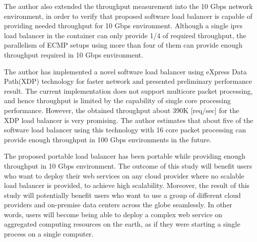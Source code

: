 The author also extended the throughput measurement into the 10 Gbps network environment, in order to verify that proposed software load balancer is capable of providing needed throughput for 10 Gbps environment.
Although a single ipvs load balancer in the container can only provide 1/4 of required throughput, the parallelism of ECMP setups using more than four of them can provide enough throughput required in 10 Gbps environment.

The author has implemented a novel software load balancer using eXpress Data Path(XDP) technology for faster network and presented preliminary performance result.
The current implementation does not support multicore packet processing, and hence throughput is limited by the capability of single core processing performance.
However, the obtained throughput about 390K [req/sec] for the XDP load balancer is very promising.
The author estimates that about five of the software load balancer using this technology with 16 core packet processing can provide enough throughput in 100  Gbps environments in the future. 

The proposed portable load balancer has been portable while providing enough throughput in 10 Gbps environment.
The outcome of this study will benefit users who want to deploy their web services on any cloud provider where no scalable load balancer is provided, to achieve high scalability.
Moreover, the result of this study will potentially benefit users who want to use a group of different cloud providers and on-premise data centers across the globe seamlessly.
In other words, users will become being able to deploy a complex web service on aggregated computing resources on the earth, as if they were starting a single process on a single computer.


